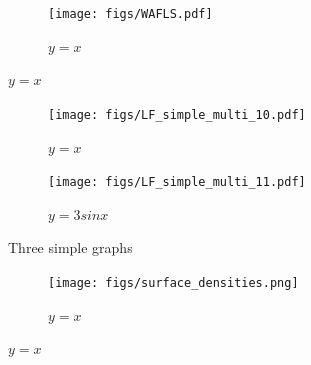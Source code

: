 \documentclass[12pt]{article}
\begin{document}
\begin{figure}
     \centering
     \begin{subfigure}[b]{0.7\textwidth}
         \centering
         \texttt{[image: figs/WAFLS.pdf]}
         \caption{$y=x$}
         \label{fig:y equals x}
     \end{subfigure}
\end{figure}


\begin{figure}
     \centering
     \begin{subfigure}[b]{0.4\textwidth}
         \centering
         \texttt{[image: figs/LF\_simple\_multi\_10.pdf]}
         \caption{$y=x$}
         \label{fig:y equals x}
     \end{subfigure}
     \hfill
     \begin{subfigure}[b]{0.4\textwidth}
         \centering
         \texttt{[image: figs/LF\_simple\_multi\_11.pdf]}
         \caption{$y=3sinx$}
         \label{fig:three sin x}
     \end{subfigure}
        \caption{Three simple graphs}
        \label{fig:three graphs}
\end{figure}

\begin{figure}
     \centering
     \begin{subfigure}[b]{0.7\textwidth}
         \centering
         \texttt{[image: figs/surface\_densities.png]}
         \caption{$y=x$}
         \label{fig:y equals x}
     \end{subfigure}
\end{figure}
\end{document}
